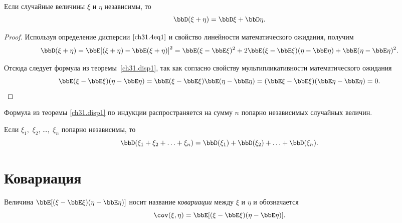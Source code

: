 \begin{thm}\label{ch31.disp1}
Если случайные величины $\xi$ и $\eta$ независимы, то $$\bbD(\xi + \eta) = \bbD\xi + \bbD\eta.$$
\end{thm}
\begin{proof}
Используя определение дисперсии $\eqref{ch31.4eq1}$ и свойство линейности математического ожидания, получим
$$
\bbD(\xi + \eta) = \bbE[(\xi + \eta) - \bbE(\xi + \eta)]^2 = \bbE(\xi - \bbE\xi)^2 + 2\bbE(\xi - \bbE\xi)(\eta - \bbE\eta) + \bbE(\eta  - \bbE\eta)^2.
$$

Отсюда следует формула из теоремы~\ref{ch31.disp1}, так как согласно свойству мультипликативности математического ожидания
\begin{equation*}
\bbE(\xi - \bbE\xi)(\eta - \bbE\eta) = \bbE(\xi - \bbE\xi)\bbE(\eta - \bbE\eta) = (\bbE\xi - \bbE\xi)(\bbE\eta - \bbE\eta) = 0. \qedhere
\end{equation*}
\end{proof}

Формула из теоремы \ref{ch31.disp1} по индукции распространяется на сумму $n$ попарно независимых случайных величин. 
\begin{cons}\label{ch31.disp13}
Если $\xi_1$,~$\xi_2$, \ldots,~$\xi_n$ попарно независимы, то 
$$
\bbD(\xi_1 + \xi_2 + \ldots + \xi_n) = \bbD(\xi_1) + \bbD(\xi_2) + \ldots + \bbD(\xi_n).
$$
\end{cons}

\section{Ковариация}
\begin{defn}
Величина $\bbE[(\xi - \bbE\xi)(\eta - \bbE\eta)]$ носит название \textit{ковариации} между $\xi$ и $\eta$ и обозначается $$\cov (\xi,\eta) = \bbE[(\xi - \bbE\xi)(\eta - \bbE\eta)].$$
\end{defn}

